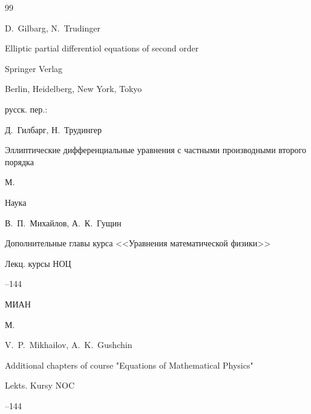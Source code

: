 \begin{thebibliography}{99}






%


\by  D.~Gilbarg,  N.~Trudinger

\book  Elliptic partial differentiol equations of second order

\publ Springer Verlag

\publaddr Berlin, Heidelberg, New York, Tokyo



\rtransl русск. пер.:~

\by Д.~Гилбарг, Н.~Трудингер

\book Эллиптические дифференциальные уравнения с частными производными второго порядка

\publaddr М.

\publ Наука








\by В.~П.~Михайлов, А.~К.~Гущин

\paper Дополнительные главы курса <<Уравнения математической физики>>

\serial Лекц. курсы НОЦ



--144

\publ МИАН

\publaddr М.





\misctransl

\by V.~P.~Mikhailov, A.~K.~Gushchin

\paper Additional chapters of course "Equations of Mathematical Physics"

\serial Lekts. Kursy NOC



--144


\end{thebibliography}
